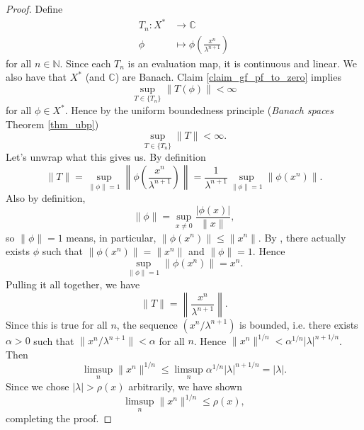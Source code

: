 \documentclass[12pt]{article}
\begin{document}
\begin{proof}
	Define 
	\begin{align*}
		T_n: X^\ast &\to \mathbb{C} \\
		\phi &\mapsto \phi\left(\frac{x^n}{\lambda^{n+1}}\right)
	\end{align*}
	for all $n\in\mathbb{N}$. Since each $T_n$ is an evaluation map, it is continuous and linear. We also have that $X^\ast$ (and $\mathbb{C}$) are Banach. Claim \ref{claim_gf_pf_to_zero} implies 
	\begin{equation*}
		\sup_{T\in \{T_n\}} \|T(\phi)\| < \infty
	\end{equation*}
	for all $\phi\in X^\ast$. Hence by the uniform boundedness principle (\textit{Banach spaces} Theorem \ref{thm_ubp})
	\begin{equation*}
		\sup_{T\in\{T_n\}} \|T\| < \infty.
	\end{equation*}
	Let's unwrap what this gives us. By definition 
	\begin{equation*}
		\|T\| = \sup_{\|\phi\|=1} \left\| \phi\left(\frac{x^n}{\lambda^{n+1}}\right)\right\| = \frac{1}{\lambda^{n+1}} \sup_{\|\phi\|=1} \|\phi(x^n)\|.
	\end{equation*}
	Also by definition, 
	\begin{equation*}
		\|\phi\| = \sup_{x\neq 0} \frac{|\phi(x)|}{\|x\|},
	\end{equation*}
	so $\|\phi\|=1$ means, in particular, $\|\phi(x^n)\| \leq \|x^n\|$. By , there actually exists $\phi$ such that $\|\phi(x^n)\| = \|x^n\|$ and $\|\phi\|=1$. Hence  
	\begin{equation*}
		\sup_{\|\phi\|=1} \|\phi(x^n)\| = x^n.
	\end{equation*}
	Pulling it all together, we have 
	\begin{equation*}
		\|T\| = \left\| \frac{x^n}{\lambda^{n+1}} \right\|.
	\end{equation*}
	Since this is true for all $n$, the sequence $(x^n/\lambda^{n+1})$ is bounded, i.e. there exists $\alpha>0$ such that  $\|x^n/\lambda^{n+1}\|<\alpha$ for all $n$. Hence $\|x^n\|^{1/n} < \alpha^{1/n} |\lambda|^{n+1/n}$. Then 
	\begin{equation*}
		\limsup_n \|x^n\|^{1/n} \leq \limsup_n \alpha^{1/n} |\lambda|^{n+1/n} = |\lambda|.
	\end{equation*}
	Since we chose $|\lambda| > \rho(x)$ arbitrarily, we have shown
	\begin{equation*}
		\limsup_n \|x^n\|^{1/n} \leq \rho(x),
	\end{equation*}
	completing the proof.
\end{proof}
\end{document}
